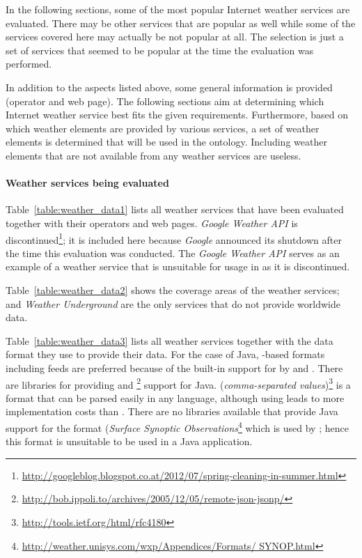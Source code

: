 In the following sections, some of the most popular Internet weather services are evaluated. There may be other services that are popular as well while some of the services covered here may actually be not popular at all. The selection is just a set of services that seemed to be popular at the time the evaluation was performed.

In addition to the aspects listed above, some general information is provided (operator and web page). The following sections aim at determining which Internet weather service best fits the given requirements. Furthermore, based on which weather elements are provided by various services, a set of weather elements is determined that will be used in the ontology. Including weather elements that are not available from any weather services are useless.

\paragraph{Weather services being evaluated}

Table~\ref{table:weather_data1} lists all weather services that have been evaluated together with their operators and web pages. \emph{Google Weather API} is discontinued\footnote{\href{http://googleblog.blogspot.co.at/2012/07/spring-cleaning-in-summer.html}{http://googleblog.blogspot.co.at/2012/07/spring-cleaning-in-summer.html}}; it is included here because \emph{Google} announced its shutdown after the time this evaluation was conducted. The \emph{Google Weather API} serves as an example of a weather service that is unsuitable for usage in \thinkhomeweather as it is discontinued.

Table~\ref{table:weather_data2} shows the coverage areas of the weather services;  and \emph{Weather Underground} are the only services that do not provide worldwide data.

Table~\ref{table:weather_data3} lists all weather services together with the data format they use to provide their data. For the case of Java, -based formats including  feeds are preferred because of the built-in support for  by  and . There are libraries for providing  and \footnote{\href{http://bob.ippoli.to/archives/2005/12/05/remote-json-jsonp/}{http://bob.ippoli.to/archives/2005/12/05/remote-json-jsonp/}} support for Java.  (\emph{comma-separated values})\footnote{\href{http://tools.ietf.org/html/rfc4180}{http://tools.ietf.org/html/rfc4180}} is a format that can be parsed easily in any language, although using  leads to more implementation costs than . There are no libraries available that provide Java support for the  format (\emph{Surface Synoptic Observations}\footnote{\href{http://weather.unisys.com/wxp/Appendices/Formats/SYNOP.html}{http://weather.unisys.com/wxp/Appendices/Formats/
SYNOP.html}} which is used by ; hence this format is unsuitable to be used in a Java application.

